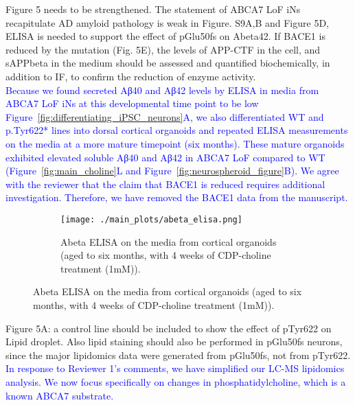 Figure 5 needs to be strengthened. The statement of ABCA7 LoF iNs recapitulate AD amyloid pathology is weak in Figure. S9A,B and Figure 5D, ELISA is needed to support the effect of pGlu50fs on Abeta42. If BACE1 is reduced by the mutation (Fig. 5E), the levels of APP-CTF in the cell, and sAPPbeta in the medium should be assessed and quantified biochemically, in addition to IF, to confirm the reduction of enzyme activity.\\
\textcolor{blue}{Because we found secreted Aβ40 and Aβ42 levels by ELISA in media from ABCA7 LoF iNs at this developmental time point to be low Figure~\ref{fig:differentiating_iPSC_neurons}A, we also differentiated WT and p.Tyr622* lines into dorsal cortical organoids and repeated ELISA measurements on the media at a more mature timepoint (six months). These mature organoids exhibited elevated soluble Aβ40 and Aβ42 in ABCA7 LoF compared to WT (Figure~\ref{fig:main_choline}L and Figure~\ref{fig:neurospheroid_figure}B). We agree with the reviewer that the claim that BACE1 is reduced requires additional investigation. Therefore, we have removed the BACE1 data from the manuscript.}

\begin{figure}[H] 
	\centering
	\begin{subfigure}[t]{.6\textwidth}
		\caption{Abeta ELISA on the media from cortical organoids (aged to six months, with 4 weeks of CDP-choline treatment (1mM)).}
		\texttt{[image: ./main\_plots/abeta\_elisa.png]}        
	\end{subfigure}  
\end{figure}

Figure 5A: a control line should be included to show the effect of pTyr622 on Lipid droplet. Also lipid staining should also be performed in pGlu50fs neurons, since the major lipidomics data were generated from pGlu50fs, not from pTyr622.\\
\textcolor{blue}{In response to Reviewer 1’s comments, we have simplified our LC-MS lipidomics analysis. We now focus specifically on changes in phosphatidylcholine, which is a known ABCA7 substrate.}


